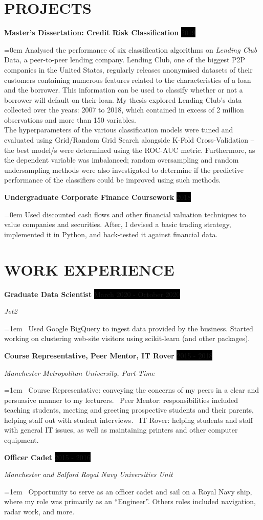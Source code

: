 \documentclass[paper=a4,fontsize=11pt]{scrartcl}
\newcommand{\sepspace}{\vspace*{1em}}
\newcommand{\NewPart}[1]{\section*{\uppercase{#1}}}
\newcommand{\WorkEntry}[4]{
		\noindent \textbf{#1} \hfill
		\colorbox{Black}{\color{White}#2} \par
		\noindent \textit{#3} \par
		\noindent\hangindent=1em\hangafter=0 \small #4
		\normalsize \par}
\newcommand{\RandomEntry}[4]{
		\noindent  \textbf{#1} \hfill
		\colorbox{Black}{\color{White}#2} \par
		\noindent \textit{#3} \par
		\noindent\hangindent=0em\hangafter=0 \small #4
		\normalsize \par}
\begin{document}

\NewPart{Projects}{}

\RandomEntry{Master's Dissertation: Credit Risk Classification}{2019}{}
{Analysed the performance of six classification algorithms on \textit{Lending Club} Data, a peer-to-peer lending company. Lending Club, one of the biggest P2P companies in the United States, regularly releases anonymised datasets of their customers containing numerous features related to the characteristics of a loan and the borrower. This information can be used to classify whether or not a borrower will default on their loan. My thesis explored Lending Club's data collected over the years: 2007 to 2018, which contained in excess of 2 million observations and more than 150 variables.\\

\noindent The hyperparameters of the various classification models were tuned and evaluated using Grid/Random Grid Search alongside K-Fold Cross-Validation -- the best model/s were determined using the ROC-AUC metric. Furthermore, as the dependent variable was imbalanced; random oversampling and random undersampling methods were also investigated to determine if the predictive performance of the classifiers could be improved using such methods.}

\sepspace

\RandomEntry{Undergraduate Corporate Finance Coursework}{2018}{}{Used discounted cash flows and other financial valuation techniques to value companies and securities. After, I devised a basic trading strategy, implemented it in Python, and back-tested it against financial data.}


\NewPart{Work Experience}{}

\WorkEntry{Graduate Data Scientist}
{March 2020 - October 2020}
{Jet2}
{\textbullet\ Used Google BigQuery to ingest data provided by the business. Started working on clustering web-site visitors using scikit-learn (and other packages).}

\sepspace

\WorkEntry{Course Representative, Peer Mentor, IT Rover}
{2015 - 2018}
{Manchester Metropolitan University, Part-Time}
{\textbullet\ Course Representative: conveying the concerns of my peers in a clear and persuasive manner to my lecturers. \newline 
\textbullet\ Peer Mentor: responsibilities included teaching students, meeting and greeting prospective students and their parents, helping staff out with student interviews. \newline 
\textbullet\ IT Rover: helping students and staff with general IT issues, as well as maintaining printers and other computer equipment.}

\sepspace

\WorkEntry
{Officer Cadet}
{2015 - 2016}
{Manchester and Salford Royal Navy Universities Unit}
{\textbullet\ Opportunity to serve as an officer cadet and sail on a Royal Navy ship, where my role was primarily as an “Engineer”. Others roles included navigation, radar work, and more.}
\end{document}
